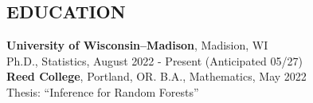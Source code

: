\documentclass[margin]{res}
\begin{document}
  
                        
\begin{resume}                        
  
\vspace*{-1em}
\section{EDUCATION}      
{\bf University of Wisconsin--Madison}, Madision, WI \\
Ph.D., Statistics, August 2022 - Present (Anticipated 05/27) \\
{\bf Reed College}, Portland, OR.
B.A., Mathematics, May 2022 \\
Thesis: ``Inference for Random Forests'' 
\vspace*{-1em}


\end{resume}
\end{document}
